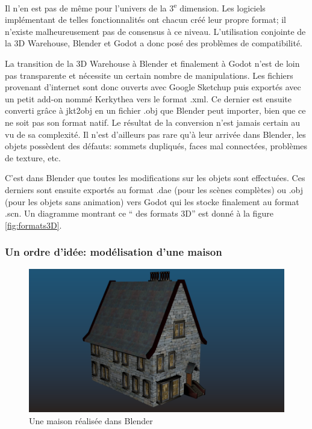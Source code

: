 Il n'en est pas de même pour l'univers de la 3\textsuperscript{e} dimension. Les logiciels implémentant de telles fonctionnalités ont chacun créé leur propre format; il n'existe malheureusement pas de consensus à ce niveau. L'utilisation conjointe de la 3D Warehouse, Blender et Godot a donc posé des problèmes de compatibilité.

La transition de la 3D Warehouse à Blender et finalement à Godot n'est de loin pas transparente et nécessite un certain nombre de manipulations. Les fichiers provenant d'internet sont donc ouverts avec Google Sketchup puis exportés avec un petit add-on nommé Kerkythea vers le format .xml. Ce dernier est ensuite converti grâce à jkt2obj en un fichier .obj que Blender peut importer, bien que ce ne soit pas son format natif. Le résultat de la conversion n'est jamais certain au vu de sa complexité. Il n'est d'ailleurs pas rare qu'à leur arrivée dans Blender, les objets possèdent des défauts: sommets dupliqués, faces mal connectées, problèmes de texture, etc.

C'est dans Blender que toutes les modifications sur les objets sont effectuées. Ces derniers sont ensuite exportés au format .dae (pour les scènes complètes) ou .obj (pour les objets sans animation) vers Godot qui les stocke finalement au format .scn. Un diagramme montrant ce \enquote{ des formats 3D} est donné à la figure \ref{fig:formats3D}.



\subsubsection{Un ordre d'idée: modélisation d'une maison}

\begin{figure}[ht!]
	\center
	\includegraphics[width=\textwidth]{images/Technique/modelisationMaison.png}
	\caption{\label{fig:modelisationMaison}Une maison réalisée dans Blender}
\end{figure}

